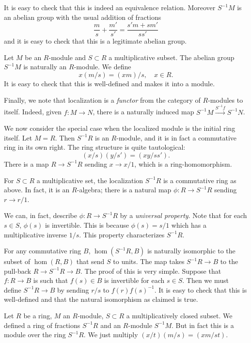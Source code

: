 It is easy to check that this is indeed an equivalence relation. Moreover
$S^{-1}M$ is an abelian group with the usual addition of fractions
\[ \frac{m}{s}+\frac{m'}{s'} = \frac{s'm + sm'}{ss'}  \]
and it is easy to check that this is a legitimate abelian group.

\begin{definition} 
Let $M$ be an $R$-module and $S \subset R$ a multiplicative subset.
The abelian group $S^{-1}M$ is naturally an $R$-module.  We define
\[ x(m/s) = (xm)/s, \quad x \in R.  \]
It is easy to check that this is well-defined and makes it into a module.

Finally, we note that localization is a \emph{functor} from the category of
$R$-modules to itself. Indeed, given $f: M \to N$, there is a naturally
induced map $S^{-1}M \stackrel{S^{-1}f}{\to} S^{-1}N$.

\end{definition} 

We now consider the special case when the localized module is the initial ring
itself. 
Let $M = R$.  Then $S^{-1}R$ is an $R$-module, and it is in fact a commutative
ring in its own right. The ring structure is quite tautological:
\[ (x/s)(y/s') = (xy/ss').  \]
There is a map $R \to S^{-1}R$ sending $x \to x/1$, which is a
ring-homomorphism.  

\begin{definition}
For $S \subset R$ a multiplicative set, the localization $S^{-1}R$ is a
commutative ring as above. In fact, it is an $R$-algebra; there is a natural
map $\phi: R \to S^{-1}R$ sending $r \to r/1$.
\end{definition} 

We can, in fact, describe $\phi: R \to S^{-1}R$ by a \emph{universal property}. Note
that for each $s \in S$, $\phi(s)$ is invertible.  This is because $\phi(s) =
s/1$ which has a multiplicative inverse $1/s$.  This property characterizes
$S^{-1}R$.  

For any commutative ring $B$, $\hom(S^{-1}R, B)$ is naturally isomorphic to the
subset of $\hom(R,B)$ that send $S$ to units.  The map takes $S^{-1}R \to B$ to
the pull-back $R \to S^{-1}R \to B$.  The proof of this is very simple.
Suppose that $f: R \to B$ is such that $f(s) \in B$ is invertible for each $s
\in S$.  Then we must define $S^{-1}R \to B$ by sending $r/s$ to
$f(r)f(s)^{-1}$.  It is easy to check that this is well-defined and that the
natural isomorphism as claimed is true.

Let $R$ be a ring, $M$ an $R$-module, $S \subset R$ a multiplicatively closed
subset. We defined a ring of fractions $S^{-1}R$ and an $R$-module $S^{-1}M$.
But in fact this is a module over the ring $S^{-1}R$.
We just multiply $(x/t)(m/s) = (xm/st)$.

